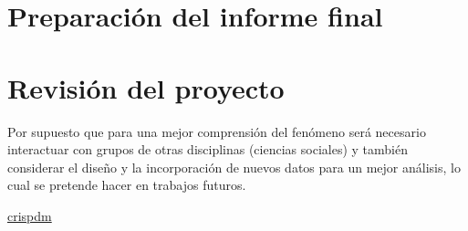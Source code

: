 \documentclass[11pt,a4paper,twoside]{tesis}
\begin{document}
\section{Preparación del informe final}
\section{Revisión del proyecto}

Por supuesto que para una mejor comprensión del fenómeno será necesario interactuar con grupos de otras disciplinas (ciencias sociales) y también considerar el diseño y  la incorporación de nuevos datos para un mejor análisis, lo cual se pretende hacer en trabajos futuros.

\backmatter



\href{https://www.ibm.com/support/knowledgecenter/es/SS3RA7_sub/modeler_crispdm_ddita/clementine/crisp_help/crisp_overview_container.html}{crispdm}

\listoftodos
\end{document}
